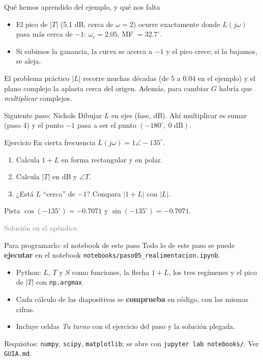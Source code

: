 \documentclass[aspectratio=169,11pt]{beamer}
\begin{document}
\begin{frame}{Qué hemos aprendido del ejemplo, y qué nos falta}
  \small
  \begin{itemize}
    \item El pico de $|T|$ (5.1 dB, cerca de $\omega=2$) ocurre exactamente donde $L(j\omega)$ pasa más cerca de $-1$: $\omega_c=2.05$, MF $=32.7^\circ$.
    \item Si subimos la ganancia, la curva se acerca a $-1$ y el pico crece; si la bajamos, se aleja.
  \end{itemize}
  \begin{block}{El problema práctico}
    $|L|$ recorre muchas décadas (de $5$ a $0.04$ en el ejemplo) y el plano complejo la aplasta cerca del origen. Además, para cambiar $G$ habría que \emph{multiplicar} complejos.
  \end{block}
  \begin{alertblock}{Siguiente paso: Nichols}
    Dibujar $L$ en ejes (fase, dB). Ahí multiplicar es sumar (paso 4) y el punto $-1$ pasa a ser el punto $(-180^\circ,\ 0\text{ dB})$.
  \end{alertblock}
\end{frame}

\begin{frame}{Ejercicio}
  \small
  En cierta frecuencia $L(j\omega)=1\angle-135^\circ$.
  \begin{enumerate}
    \item Calcula $1+L$ en forma rectangular y en polar.
    \item Calcula $|T|$ en dB y $\angle T$.
    \item ¿Está $L$ ``cerca'' de $-1$? Compara $|1+L|$ con $|L|$.
  \end{enumerate}
  \begin{block}{Pista}
    $\cos(-135^\circ)=-0.7071$ y $\sin(-135^\circ)=-0.7071$.
  \end{block}
  \textcolor{gray}{Solución en el apéndice.}
\end{frame}

\begin{frame}{Para programarlo: el notebook de este paso}
  \small
  Todo lo de este paso se puede \textbf{ejecutar} en el notebook \texttt{notebooks/paso05\_realimentacion.ipynb}.
  \begin{itemize}
    \item Python: $L$, $T$ y $S$ como funciones, la flecha $1+L$, los tres regímenes y el pico de $|T|$ con \texttt{np.argmax}.
    \item Cada cálculo de las diapositivas se \textbf{comprueba} en código, con las mismas cifras.
    \item Incluye celdas \emph{Tu turno} con el ejercicio del paso y la solución plegada.
  \end{itemize}
  \footnotesize Requisitos: \texttt{numpy}, \texttt{scipy}, \texttt{matplotlib}; se abre con \texttt{jupyter lab notebooks/}. Ver \texttt{GUIA.md}.
\end{frame}
\end{document}
